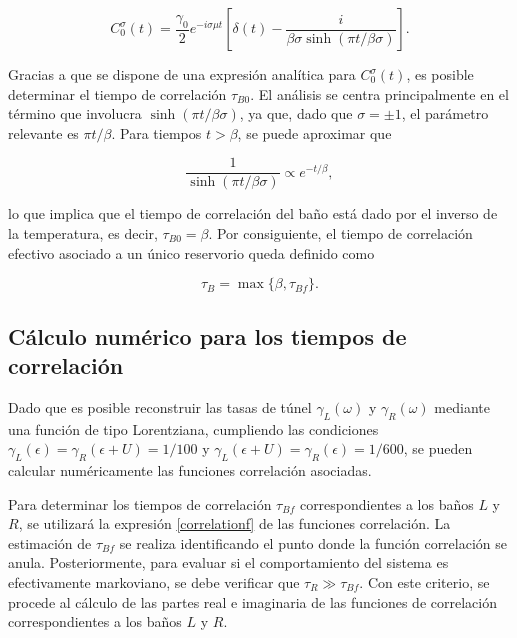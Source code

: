 \begin{appendixs}
\begin{equation*}
    C^{\sigma}_{0}(t) = \frac{\gamma_{0}}{2}e^{-i\sigma \mu t} \left[\delta(t) - \frac{i}{\beta \sigma \sinh(\pi t/\beta \sigma)} \right].
\end{equation*}

Gracias a que se dispone de una expresión analítica para $C^{\sigma}_{0}(t)$, es posible determinar el tiempo de correlación $\tau_{B0}$. El análisis se centra principalmente en el término que involucra $\sinh(\pi t/\beta \sigma)$, ya que, dado que $\sigma = \pm 1$, el parámetro relevante es $\pi t/\beta$. Para tiempos $t > \beta$, se puede aproximar que 

\[
\frac{1}{\sinh(\pi t/\beta \sigma)} \propto e^{-t/\beta},
\]

lo que implica que el tiempo de correlación del baño está dado por el inverso de la temperatura, es decir, $\tau_{B0} = \beta$. Por consiguiente, el tiempo de correlación efectivo asociado a un único reservorio queda definido como

\[
\tau_{B} = \max \{\beta, \tau_{Bf}\}.
\]

\label{appendix5correlation}

\subsection{Cálculo numérico para los tiempos de correlación}
Dado que es posible reconstruir las tasas de túnel $\gamma_{L}(\omega)$ y $\gamma_{R}(\omega)$ mediante una función de tipo Lorentziana, cumpliendo las condiciones $\gamma_{L}(\epsilon) = \gamma_{R}(\epsilon+U) = 1/100$ y $\gamma_{L}(\epsilon+U) = \gamma_{R}(\epsilon) = 1/600$, se pueden calcular numéricamente las funciones correlación asociadas. 

Para determinar los tiempos de correlación $\tau_{Bf}$ correspondientes a los baños $L$ y $R$, se utilizará la expresión \ref{correlationf} de las funciones correlación. La estimación de $\tau_{Bf}$ se realiza identificando el punto donde la función correlación se anula. Posteriormente, para evaluar si el comportamiento del sistema es efectivamente markoviano, se debe verificar que $\tau_{R} \gg \tau_{Bf}$. Con este criterio, se procede al cálculo de las partes real e imaginaria de las funciones de correlación correspondientes a los baños $L$ y $R$.



\end{appendixs}
